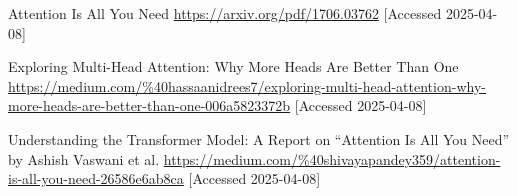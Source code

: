 \documentclass[licencjacka,en]{pracamgr}
\begin{document}
\begin{thebibliography}{99}
    Attention Is All You Need
    \url{https://arxiv.org/pdf/1706.03762} 
    [Accessed 2025-04-08]
    
    Exploring Multi-Head Attention: Why More Heads Are Better Than One
    \url{https://medium.com/%40hassaanidrees7/exploring-multi-head-attention-why-more-heads-are-better-than-one-006a5823372b}
    [Accessed 2025-04-08]
    
    Understanding the Transformer Model: A Report on “Attention Is All You Need” by Ashish Vaswani et al.
    \url{https://medium.com/%40shivayapandey359/attention-is-all-you-need-26586e6ab8ca}
    [Accessed 2025-04-08]
    
    
    \end{thebibliography}
    
\end{document}
